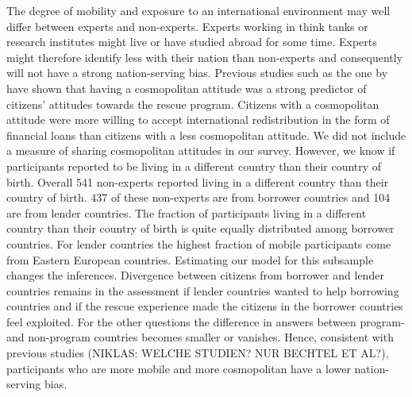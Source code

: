 The degree of mobility and exposure to an international environment may well differ between experts and non-experts. Experts working in think tanks or research institutes might live or have studied abroad for some time. Experts might therefore identify less with their nation than non-experts and consequently will not have a strong nation-serving bias. Previous studies such as the one by \cite{bechtel} have shown that having a cosmopolitan attitude was a strong predictor of citizens' attitudes towards the rescue program. Citizens with a cosmopolitan attitude were more willing to accept international redistribution in the form of financial loans than citizens with a less cosmopolitan attitude. We did not include a measure of sharing cosmopolitan attitudes in our survey. However, we know if participants reported to be living in a different country than their country of birth. Overall 541 non-experts reported living in a different country than their country of birth. 437 of these non-experts are from borrower countries and 104 are from lender countries. The fraction of participants living in a different country than their country of birth is quite equally distributed among borrower countries. For lender countries the highest fraction of mobile participants come from Eastern European countries. Estimating our model for this subsample changes the inferences. Divergence between citizens from borrower and lender countries remains in the assessment if lender countries wanted to help borrowing countries and if the rescue experience made the citizens in the borrower countries feel exploited. For the other questions the difference in answers between program- and non-program countries becomes smaller or vanishes. Hence, consistent with previous studies (NIKLAS: WELCHE STUDIEN? NUR BECHTEL ET AL?), participants who are more mobile and more cosmopolitan have a lower nation-serving bias.  \\


